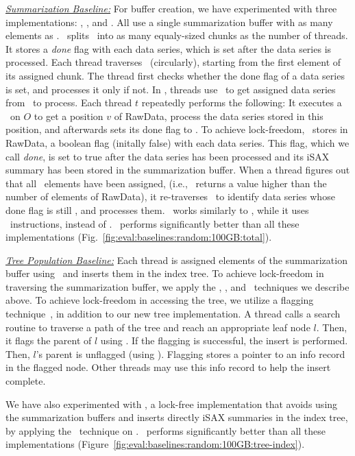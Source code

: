 \noindent
{\emph{\underline{Summarization Baseline:}}}
For buffer creation, we have experimented with three implementations: \DoAllSplit,
\FI, and \CASBased. All use a single summarization buffer with as many
elements as \RawData.
% 
\DoAllSplit\ splits \RawData\ into as many equaly-sized chunks as the number of threads.  
It stores a {\em done} flag with each data series, which is set after the data series is processed.
Each thread traverses \RawData\ (circularly), starting from the first element of its assigned chunk.
The thread first checks whether the done flag of a data series is set, and processes it only if not. 
%
In \FI, threads use \FAI\ to get assigned data series from \RawData\ to process.  
Each thread $t$ repeatedly performs the following:
It executes a \FAI\ on $O$ to get a position $v$ of RawData,
process the data series stored in this position, and afterwards sets its done flag to \True.
To achieve lock-freedom, \FI\ stores in RawData, a boolean flag (initally false) with each data series. 
This flag, which we call {\em done}, is set to true after the data series has been processed and its iSAX summary 
has been stored in the summarization buffer. 
When a thread figures out that all \RawData\ elements have been assigned,
(i.e., \FAI\ returns a value higher than the number of elements of RawData), 
it re-traverses \RawData\ to identify data series whose done flag is still \False,
and processes them. 
%
\CASBased\ works similarly to \FI, while it uses \CAS\ instructions, instead of \FAI.
%
\Fresh\ performs significantly better than all these implementations
(Fig.~\ref{fig:eval:baselines:random:100GB:total}).


\noindent
{\emph{\underline{Tree Population Baseline:}}}
Each thread is assigned elements of the summarization buffer using \FAI\
and inserts them in the index tree. 
To achieve lock-freedom in traversing the summarization buffer, 
we apply the \DoAllSplit, \FI, and \CASBased\ techniques we describe above.
%
To achieve lock-freedom in accessing the tree, we utilize a flagging technique~\cite{EFR+10},
in addition to our new tree implementation. 
A thread calls a search routine to traverse a path of the tree and reach an appropriate leaf
node $l$. Then, it flags the parent of $l$ using \CAS. If the flagging is successful, the insert
is performed. Then, $l$'s parent is unflagged (using \CAS).
Flagging stores a pointer to an info record in the flagged node.
Other threads may use this info record to help the insert complete. 

We have also experimented with \FINoSum, a lock-free implementation that 
avoids using the summarization buffers and inserts directly iSAX summaries in the index tree, 
by applying the \FI\ technique on \RawData.
%
\Fresh\ performs significantly better than all these implementations
(Figure~\ref{fig:eval:baselines:random:100GB:tree-index}).


